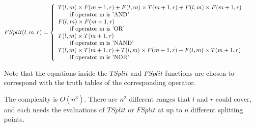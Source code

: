 \documentclass[a4paper]{article}
\begin{document}
	$$FSplit(l,m,r)=\left\{
	\begin{array}{lr}
		T(l,m)\times F(m+1,r) + F(l,m)\times T(m+1,r) + F(l,m)\times F(m+1,r)&\\
		\mbox{\quad\quad if operator m is 'AND'}&\\
		F(l,m)\times F(m+1,r)\\
		\mbox{\quad\quad if operator m is 'OR'}\\
		T(l,m)\times T(m+1,r)\\
		\mbox{\quad\quad if operator m is 'NAND'}\\
		T(l,m)\times T(m+1,r)+ T(l,m)\times F(m+1,r)+ F(l,m)\times T(m+1,r)\\
		\mbox{\quad\quad if operator m is 'NOR'}
	\end{array}
	\right.
	$$
	
	Note that the equations inside the $TSplit$ and $FSplit$ functions are chosen to correspond with the truth tables of the corresponding operator.
	
	The complexity is $O(n^3)$. There are $n^2$ different ranges that $l$ and $r$ could cover, and each needs the evaluations of $TSplit$ or $FSplit$ at up to $n$ different splitting points.



		
	
	
	
	
	
	
	
	
	
	
	
	
	
	
	
	
	
	
	
	
\end{document}
